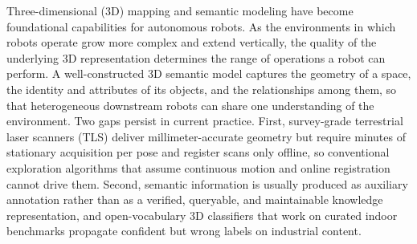\documentclass[11pt,a4paper]{skkuthesis}
\begin{document}
\makecover
\makeinsidecover
\makesubmission
\makeapproval

\frontmatterstyle

\tableofcontents
\listoftables
\listoffigures

\begin{englishabstract}
Three-dimensional (3D) mapping and semantic modeling have become foundational
capabilities for autonomous robots. As the environments in which robots operate
grow more complex and extend vertically, the quality of the underlying 3D
representation determines the range of operations a robot can perform. A
well-constructed 3D semantic model captures the geometry of a space, the
identity and attributes of its objects, and the relationships among them, so
that heterogeneous downstream robots can share one understanding of the
environment. Two gaps persist in current practice. First, survey-grade
terrestrial laser scanners (TLS) deliver millimeter-accurate geometry but
require minutes of stationary acquisition per pose and register scans only
offline, so conventional exploration algorithms that assume continuous motion
and online registration cannot drive them. Second, semantic information is
usually produced as auxiliary annotation rather than as a verified, queryable,
and maintainable knowledge representation, and open-vocabulary 3D classifiers
that work on curated indoor benchmarks propagate confident but wrong labels on
industrial content.


\end{englishabstract}
\end{document}
